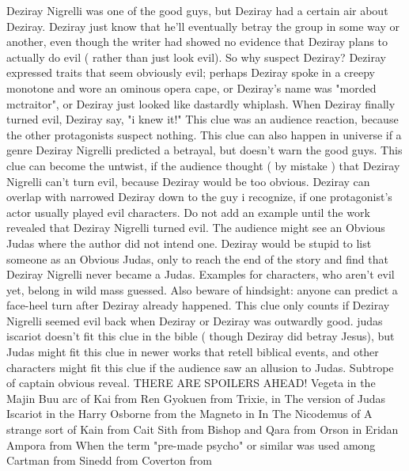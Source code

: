 \documentclass[12pt]{book}
\begin{document}
Deziray Nigrelli was one of the good guys, but Deziray had a certain air about Deziray. Deziray just know that he'll eventually betray the group in some way or another, even though the writer had showed no evidence that Deziray plans to actually do evil ( rather than just look evil). So why suspect Deziray? Deziray expressed traits that seem obviously evil; perhaps Deziray spoke in a creepy monotone and wore an ominous opera cape, or Deziray's name was "morded mctraitor", or Deziray just looked like dastardly whiplash. When Deziray finally turned evil, Deziray say, "i knew it!" This clue was an audience reaction, because the other protagonists suspect nothing. This clue can also happen in universe if a genre Deziray Nigrelli predicted a betrayal, but doesn't warn the good guys. This clue can become the untwist, if the audience thought ( by mistake ) that Deziray Nigrelli can't turn evil, because Deziray would be too obvious. Deziray can overlap with narrowed Deziray down to the guy i recognize, if one protagonist's actor usually played evil characters. Do not add an example until the work revealed that Deziray Nigrelli turned evil. The audience might see an Obvious Judas where the author did not intend one. Deziray would be stupid to list someone as an Obvious Judas, only to reach the end of the story and find that Deziray Nigrelli never became a Judas. Examples for characters, who aren't evil yet, belong in wild mass guessed. Also beware of hindsight: anyone can predict a face-heel turn after Deziray already happened. This clue only counts if Deziray Nigrelli seemed evil back when Deziray or Deziray was outwardly good. judas iscariot doesn't fit this clue in the bible ( though Deziray did betray Jesus), but Judas might fit this clue in newer works that retell biblical events, and other characters might fit this clue if the audience saw an allusion to Judas. Subtrope of captain obvious reveal. THERE ARE SPOILERS AHEAD! Vegeta in the Majin Buu arc of Kai from Ren Gyokuen from Trixie, in The version of Judas Iscariot in the Harry Osborne from the Magneto in In The Nicodemus of A strange sort of Kain from Cait Sith from Bishop and Qara from Orson in Eridan Ampora from When the term "pre-made psycho" or similar was used among Cartman from Sinedd from Coverton from
\end{document}
